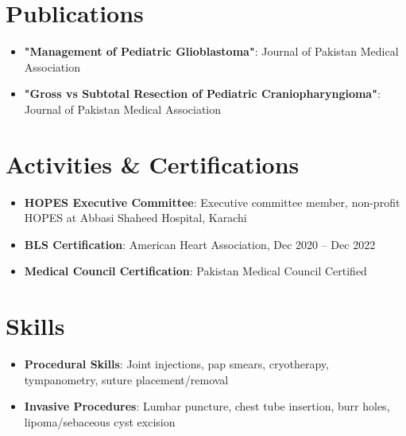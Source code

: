 \documentclass[letterpaper,10pt]{article}
\newcommand{\resumeItem}[2]{
  \item\small{
    \textbf{#1}{: #2 \vspace{-2pt}}
  }
}
\newcommand{\resumeSubHeadingListStart}{\begin{itemize}[leftmargin=*]}
\newcommand{\resumeSubHeadingListEnd}{\end{itemize}}
\newcommand{\resumeItemListStart}{\begin{itemize}}
\newcommand{\resumeItemListEnd}{\end{itemize}\vspace{-5pt}}
\begin{document}
\section{Publications}
  \resumeItemListStart
    \resumeItem{"Management of Pediatric Glioblastoma"}{Journal of Pakistan Medical Association}
    \resumeItem{"Gross vs Subtotal Resection of Pediatric Craniopharyngioma"}{Journal of Pakistan Medical Association}
  \resumeItemListEnd


\section{Activities \& Certifications}
  \resumeItemListStart
    \resumeItem{HOPES Executive Committee}{Executive committee member, non-profit HOPES at Abbasi Shaheed Hospital, Karachi}
    \resumeItem{BLS Certification}{American Heart Association, Dec 2020 -- Dec 2022}
    \resumeItem{Medical Council Certification}{Pakistan Medical Council Certified}
  \resumeItemListEnd


\section{Skills}
  \resumeItemListStart
    \resumeItem{Procedural Skills}{Joint injections, pap smears, cryotherapy, tympanometry, suture placement/removal}
    \resumeItem{Invasive Procedures}{Lumbar puncture, chest tube insertion, burr holes, lipoma/sebaceous cyst excision}
  \resumeItemListEnd




\end{document}
